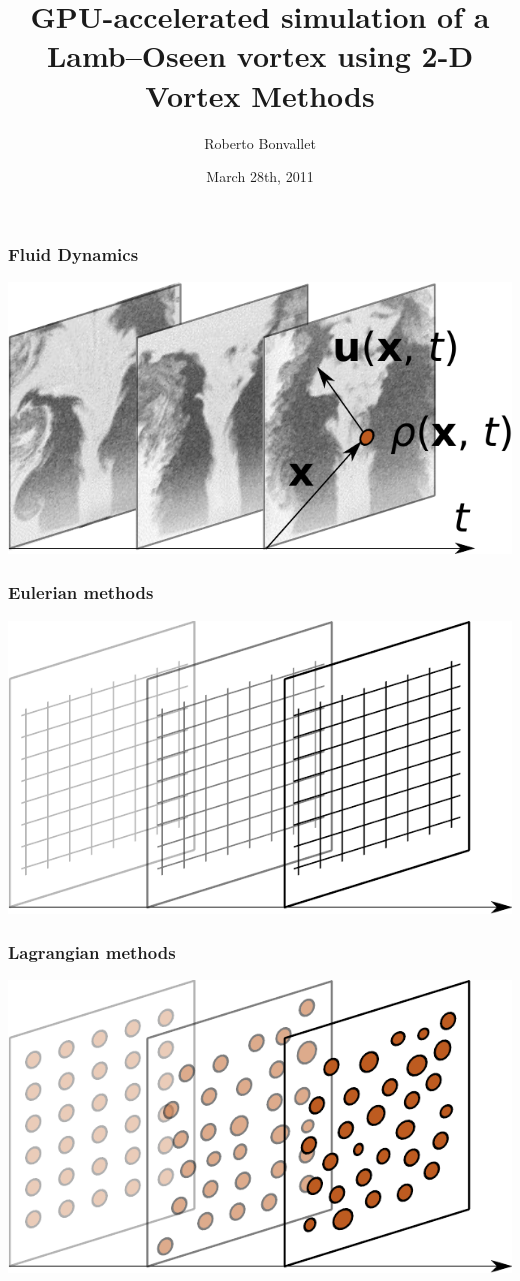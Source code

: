 \documentclass[12pt,english,dvipsnames]{beamer}
\title{GPU-accelerated simulation of a Lamb--Oseen vortex
using 2-D Vortex Methods}
\author{Roberto Bonvallet}
\date{March 28th, 2011}
\begin{document}
  \begin{frame}
    \maketitle
  \end{frame}

  \begin{frame}
    \frametitle{Fluid Dynamics}
    \includegraphics{fluid1.pdf}
  \end{frame}

  \begin{frame}
    \frametitle{Eulerian methods}
    \includegraphics{fluid2.pdf}
  \end{frame}

  \begin{frame}
    \frametitle{Lagrangian methods}
    \includegraphics{fluid3.pdf}
  \end{frame}
\end{document}
